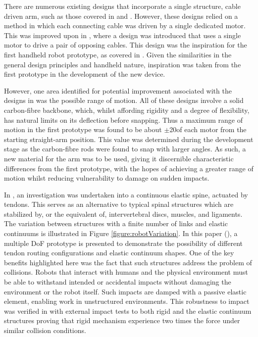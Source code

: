\documentclass[11pt]{article}
\begin{document}
There are numerous existing designs that incorporate a single structure, cable driven arm, such as those covered in \cite{godage2011} and \cite{zhang2011}. However, these designs relied on a method in which each connecting cable was driven by a single dedicated motor. This was improved upon in \cite{yoon2009}, where a design was introduced that uses a single motor to drive a pair of opposing cables. This design was the inspiration for the first handheld robot prototype, as covered in \cite{GreggSmithDesign}. Given the similarities in the general design principles and handheld nature, inspiration was taken from the first prototype in the development of the new device.

However, one area identified for potential improvement associated with the designs in \cite{godage2011}\cite{zhang2011}\cite{GreggSmithDesign} was the possible range of motion. All of these designs involve a solid carbon-fibre backbone, which, whilst affording rigidity and a degree of flexibility, has natural limits on its deflection before snapping. Thus a maximum range of motion in the first prototype was found to be about $\pm$20\degree of each motor from the starting straight-arm position. This value was determined during the development stage as the carbon-fibre rods were found to snap with larger angles. As such, a new material for the arm was to be used, giving it discernible characteristic differences from the first prototype, with the hopes of achieving a greater range of motion whilst reducing vulnerability to damage on sudden impacts.

In \cite{reinecke2016}, an investigation was undertaken into a continuous elastic spine, actuated by tendons. This serves as an alternative to typical spinal structures which are stabilized by, or the equivalent of, intervertebral discs, muscles, and ligaments. The variation between structures with a finite number of links and elastic continuums is illustrated in Figure \ref{figure:robotVariation}. In this paper (\cite{reinecke2016}), a multiple DoF prototype is presented to demonstrate the possibility of different tendon routing configurations and elastic continuum shapes. One of the key benefits highlighted here was the fact that such structures address the problem of collisions. Robots that interact with humans and the physical environment must be able to withstand intended or accidental impacts without damaging the environment or the robot itself. Such impacts are damped with a passive elastic element, enabling work in unstructured environments. This robustness to impact was verified in \cite{reinecke2016} with external impact tests to both rigid and the elastic continuum structures proving that rigid mechanism experience two times the force under similar collision conditions.
\end{document}
